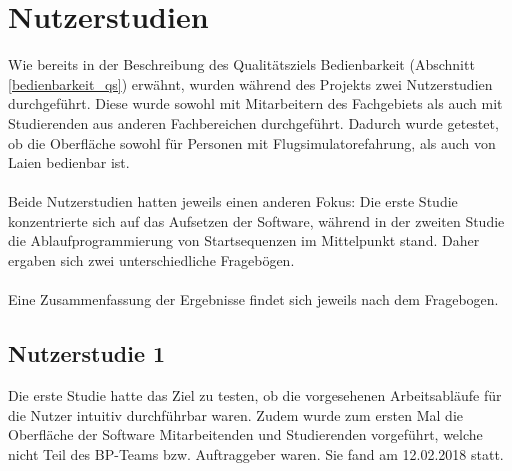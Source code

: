\section{Nutzerstudien}
Wie bereits in der Beschreibung des Qualitätsziels Bedienbarkeit (Abschnitt \ref{bedienbarkeit_qs})
erwähnt, wurden während des Projekts zwei Nutzerstudien durchgeführt. Diese wurde sowohl mit
Mitarbeitern des Fachgebiets als auch mit Studierenden aus anderen Fachbereichen durchgeführt.
Dadurch wurde getestet, ob die Oberfläche sowohl für Personen mit Flugsimulatorefahrung, als auch
von Laien bedienbar ist.
\\\\
Beide Nutzerstudien hatten jeweils einen anderen Fokus:
Die erste Studie konzentrierte sich auf das Aufsetzen der Software, während in der zweiten Studie
die Ablaufprogrammierung von Startsequenzen im Mittelpunkt stand. Daher ergaben sich zwei unterschiedliche
Fragebögen.
\\\\
Eine Zusammenfassung der Ergebnisse findet sich jeweils nach dem Fragebogen.

\subsection{Nutzerstudie 1}
Die erste Studie hatte das Ziel zu testen, ob die vorgesehenen Arbeitsabläufe für die Nutzer
intuitiv durchführbar waren. Zudem wurde zum ersten Mal die Oberfläche der Software Mitarbeitenden und Studierenden
vorgeführt, welche nicht Teil des BP-Teams bzw. Auftraggeber waren. Sie fand am 12.02.2018 statt.


